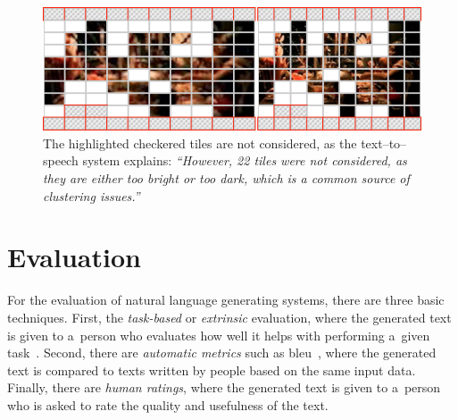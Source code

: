 \documentclass{article}
\begin{document}
\begin{figure}[t!]
  \centering
  \includegraphics[width=0.75\linewidth]{./tile-highlight.png}
  \caption{The highlighted checkered tiles are not considered, as the text--to--speech system explains: \textit{``However, 22 tiles were not considered, as they are either too bright or too dark, which is a common source of clustering issues.''}}
  \label{fig:tile-highlight}
\end{figure}


\vspace{-0.5cm}
\section{Evaluation}
\label{sec:evaluation}
For the evaluation of natural language generating systems, there are three basic techniques. First, the \emph{task-based} or \emph{extrinsic} evaluation,
where the generated text is given to a~person who evaluates how well it helps with performing a~given task~\cite{portet2009nlg}. Second, there are \emph{automatic metrics} such as {\sc bleu}~\cite{papineni2002bleu}, where the generated text is compared to texts written by people based on the same input data. Finally, there are \emph{human ratings}, where the generated text is given to a~person who is asked to rate the quality and usefulness of the text.
\end{document}
